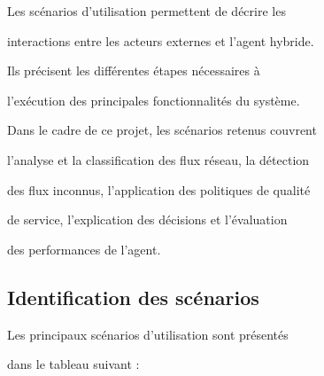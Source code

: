 Les scénarios d'utilisation permettent de décrire les

interactions entre les acteurs externes et l'agent hybride.

Ils précisent les différentes étapes nécessaires à

l'exécution des principales fonctionnalités du système.



Dans le cadre de ce projet, les scénarios retenus couvrent

l'analyse et la classification des flux réseau, la détection

des flux inconnus, l'application des politiques de qualité

de service, l'explication des décisions et l'évaluation

des performances de l'agent.



\subsection{Identification des scénarios}



Les principaux scénarios d'utilisation sont présentés

dans le tableau suivant :



